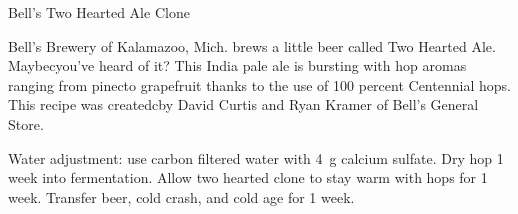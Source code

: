 \stylesection{\styleamericanipa}

\begin{recipie}{Bell's Two Hearted Ale Clone}

\begin{aboutblock}
Bell's Brewery of Kalamazoo, Mich. brews a little beer called Two Hearted Ale.
Maybecyou've heard of it? This India pale ale is bursting with hop aromas ranging
from pinecto grapefruit thanks to the use of 100 percent Centennial hops. This
recipe was createdcby David Curtis and Ryan Kramer of Bell's General Store.
\sourceaha
\end{aboutblock}


\begin{methodandtiming}
 
\begin{mashsteps}
\end{mashsteps}

\begin{directions}
Water adjustment: use carbon filtered water with 4~g calcium sulfate.
Dry hop 1 week into fermentation. Allow two hearted clone to stay warm with hops
for 1 week. Transfer beer, cold crash, and cold age for 1 week.
\end{directions}

\end{methodandtiming}

\pagebreak

\begin{ingredientsblock}

\begin{malts}
\end{malts}

\begin{hops}
\end{hops}


\end{ingredientsblock}

\end{recipie}

